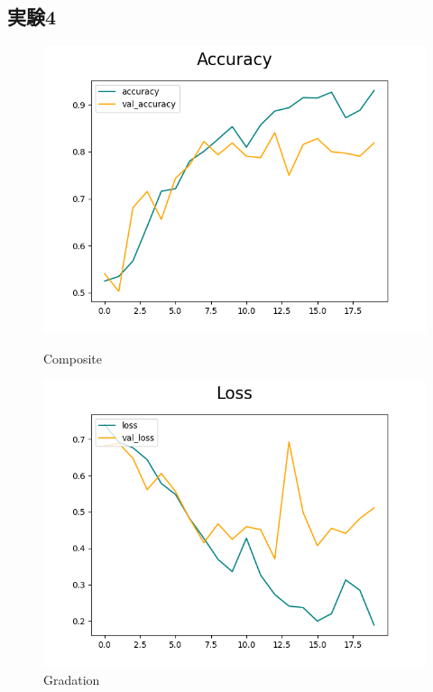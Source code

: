 \documentclass[a4paper, 11pt, titlepage]{jsarticle}
\begin{document}
\subsection{実験4}
\begin{figure}[htbp]
  \begin{minipage}[b]{0.45\linewidth}
    \centering
    \includegraphics[keepaspectratio, scale=0.435]{ex4_acc.png}
    \caption{Composite}
  \end{minipage}
  \begin{minipage}[b]{0.45\linewidth}
    \centering
    \includegraphics[keepaspectratio, scale=0.435]{ex4_loss.png}
    \caption{Gradation}
  \end{minipage}
\end{figure}
\end{document}
